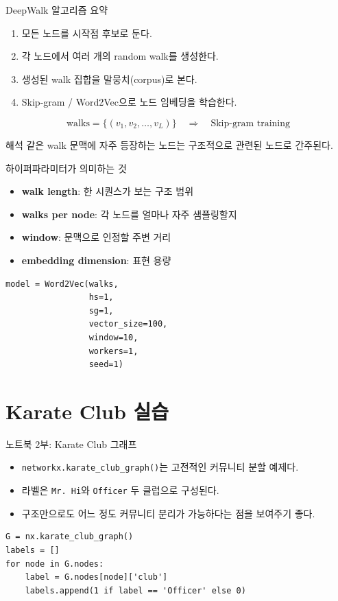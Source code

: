 \begin{frame}{DeepWalk 알고리즘 요약}
\begin{enumerate}
  \item 모든 노드를 시작점 후보로 둔다.
  \item 각 노드에서 여러 개의 random walk를 생성한다.
  \item 생성된 walk 집합을 말뭉치(corpus)로 본다.
  \item Skip-gram / Word2Vec으로 노드 임베딩을 학습한다.
\end{enumerate}
\vspace{0.4em}
\[
\text{walks} = \{(v_1,v_2,\dots,v_L)\} \quad \Rightarrow \quad \text{Skip-gram training}
\]
\vspace{0.3em}
\begin{block}{해석}
같은 walk 문맥에 자주 등장하는 노드는 구조적으로 관련된 노드로 간주된다.
\end{block}
\end{frame}

\begin{frame}[fragile]{하이퍼파라미터가 의미하는 것}
\small
\begin{itemize}
  \item \textbf{walk length}: 한 시퀀스가 보는 구조 범위
  \item \textbf{walks per node}: 각 노드를 얼마나 자주 샘플링할지
  \item \textbf{window}: 문맥으로 인정할 주변 거리
  \item \textbf{embedding dimension}: 표현 용량
\end{itemize}
\vspace{0.4em}
\begin{lstlisting}
model = Word2Vec(walks,
                 hs=1,
                 sg=1,
                 vector_size=100,
                 window=10,
                 workers=1,
                 seed=1)
\end{lstlisting}
\end{frame}

\section{Karate Club 실습}

\begin{frame}[fragile]{노트북 2부: Karate Club 그래프}
\begin{itemize}
  \item \texttt{networkx.karate\_club\_graph()}는 고전적인 커뮤니티 분할 예제다.
  \item 라벨은 \texttt{Mr. Hi}와 \texttt{Officer} 두 클럽으로 구성된다.
  \item 구조만으로도 어느 정도 커뮤니티 분리가 가능하다는 점을 보여주기 좋다.
\end{itemize}
\vspace{0.3em}
\begin{lstlisting}
G = nx.karate_club_graph()
labels = []
for node in G.nodes:
    label = G.nodes[node]['club']
    labels.append(1 if label == 'Officer' else 0)
\end{lstlisting}
\end{frame}

